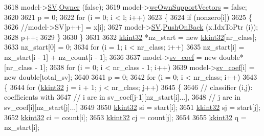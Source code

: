\begin{DoxyCode}
{{3618     model->\hyperlink{struct_s_v_m289___b_f_s_1_1svm__model_a0be330087c161794b8127ebaf8efa51b}{SV}.\hyperlink{class_k_k_b_1_1_k_k_queue_a4990d037ff09dd504cc7df53819bf61a}{Owner} (\textcolor{keyword}{false});
3619     model->\hyperlink{struct_s_v_m289___b_f_s_1_1svm__model_ab9180dbd9f7c9efcc1e95e543a908afe}{weOwnSupportVectors} = \textcolor{keyword}{false};
3620 
3621     p = 0;
3622     \textcolor{keywordflow}{for}  (i = 0;  i < l;  i++)
3623     \{
3624       \textcolor{keywordflow}{if}  (nonzero[i])
3625       \{
3626         \textcolor{comment}{//model->SV[p++] = x[i];}
3627         model->\hyperlink{struct_s_v_m289___b_f_s_1_1svm__model_a0be330087c161794b8127ebaf8efa51b}{SV}.\hyperlink{class_k_k_m_l_l_1_1_feature_vector_list_abd43779a90a6aa3db1de8092be877bdb}{PushOnBack} (x.IdxToPtr (i));
3628         p++;
3629       \}
3630     \}
3631 
3632     \hyperlink{namespace_k_k_b_a8fa4952cc84fda1de4bec1fbdd8d5b1b}{kkint32} *nz\_start = \textcolor{keyword}{new} \hyperlink{namespace_k_k_b_a8fa4952cc84fda1de4bec1fbdd8d5b1b}{kkint32}[nr\_class];
3633     nz\_start[0] = 0;
3634     \textcolor{keywordflow}{for}  (i = 1;  i < nr\_class;  i++)
3635       nz\_start[i] = nz\_start[i - 1] + nz\_count[i - 1];
3636 
3637     model->\hyperlink{struct_s_v_m289___b_f_s_1_1svm__model_aad74e2dda9d5517b2b04d7d82b5e8e5c}{sv\_coef} = \textcolor{keyword}{new} \textcolor{keywordtype}{double}*[nr\_class - 1];
3638     \textcolor{keywordflow}{for}  (i = 0;  i < nr\_class - 1;  i++)
3639       model->\hyperlink{struct_s_v_m289___b_f_s_1_1svm__model_aad74e2dda9d5517b2b04d7d82b5e8e5c}{sv\_coef}[i] = \textcolor{keyword}{new} \textcolor{keywordtype}{double}[total\_sv];
3640 
3641     p = 0;
3642     for  (i = 0;  i < nr\_class;  i++)
3643     \{
3644       \textcolor{keywordflow}{for}  (\hyperlink{namespace_k_k_b_a8fa4952cc84fda1de4bec1fbdd8d5b1b}{kkint32} j = i + 1;  j < nr\_class;  j++)
3645       \{
3646         \textcolor{comment}{// classifier (i,j): coefficients with}
3647         \textcolor{comment}{// i are in sv\_coef[j-1][nz\_start[i]...],}
3648         \textcolor{comment}{// j are in sv\_coef[i][nz\_start[j]...]}
3649 
3650         \hyperlink{namespace_k_k_b_a8fa4952cc84fda1de4bec1fbdd8d5b1b}{kkint32} si = start[i];
3651         \hyperlink{namespace_k_k_b_a8fa4952cc84fda1de4bec1fbdd8d5b1b}{kkint32} sj = start[j];
3652         \hyperlink{namespace_k_k_b_a8fa4952cc84fda1de4bec1fbdd8d5b1b}{kkint32} ci = count[i];
3653         \hyperlink{namespace_k_k_b_a8fa4952cc84fda1de4bec1fbdd8d5b1b}{kkint32} cj = count[j];
3654         
3655         \hyperlink{namespace_k_k_b_a8fa4952cc84fda1de4bec1fbdd8d5b1b}{kkint32} q = nz\_start[i];
}}
\end{DoxyCode}
